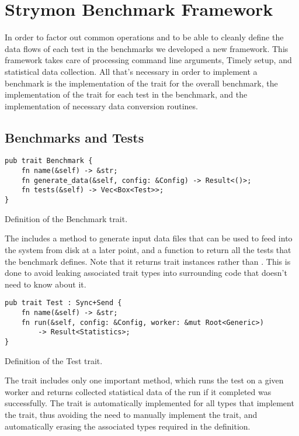 \section{Strymon Benchmark Framework}
In order to factor out common operations and to be able to cleanly define the data flows of each test in the benchmarks we developed a new framework. This framework takes care of processing command line arguments, Timely setup, and statistical data collection. All that's necessary in order to implement a benchmark is the implementation of the  trait for the overall benchmark, the implementation of the  trait for each test in the benchmark, and the implementation of necessary data conversion routines.

\subsection{Benchmarks and Tests}
\begin{listing}[H]
\begin{verbatim}
pub trait Benchmark {
    fn name(&self) -> &str;
    fn generate_data(&self, config: &Config) -> Result<()>;
    fn tests(&self) -> Vec<Box<Test>>;
}
\end{verbatim}
  \caption{Definition of the Benchmark trait.}
  \label{lst:benchmark-trait}
\end{listing}

The  includes a method to generate input data files that can be used to feed into the system from disk at a later point, and a function to return all the tests that the benchmark defines. Note that it returns  trait instances rather than . This is done to avoid leaking associated trait types into surrounding code that doesn't need to know about it.

\begin{listing}[H]
\begin{verbatim}
pub trait Test : Sync+Send {
    fn name(&self) -> &str;
    fn run(&self, config: &Config, worker: &mut Root<Generic>)
        -> Result<Statistics>;
}
\end{verbatim}
  \caption{Definition of the Test trait.}
  \label{lst:test-trait}
\end{listing}

The  trait includes only one important method, which runs the test on a given worker and returns collected statistical data of the run if it completed was successfully. The  trait is automatically implemented for all types that implement the  trait, thus avoiding the need to manually implement the  trait, and automatically erasing the associated types required in the  definition.


